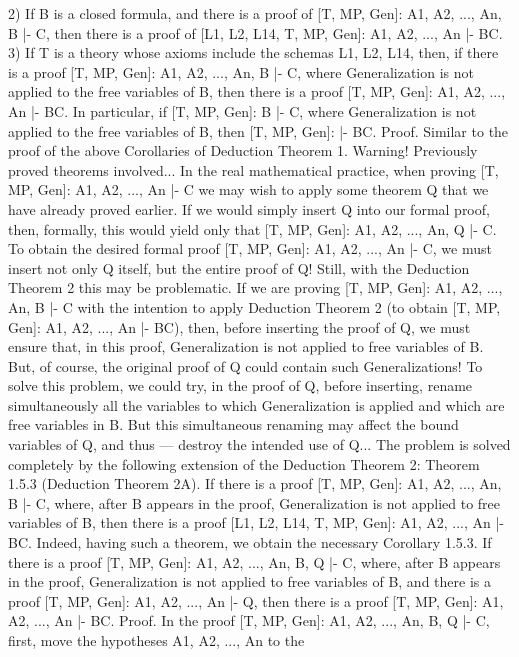 2) If B is a closed formula, and there is a proof of [T, MP, Gen]: A1, A2, ..., An, B |- C, then there is a
proof of [L1, L2, L14, T, MP, Gen]: A1, A2, ..., An |- B\IMPLIES C.
3) If T is a theory whose axioms include the schemas L1, L2, L14, then, if there is a proof [T, MP, Gen]:
A1, A2, ..., An, B |- C, where Generalization is not applied to the free variables of B, then there is a proof
[T, MP, Gen]: A1, A2, ..., An |- B\IMPLIES C. In particular, if [T, MP, Gen]: B |- C, where Generalization is not
applied to the free variables of B, then [T, MP, Gen]: |- B\IMPLIES C.
Proof. Similar to the proof of the above Corollaries of Deduction Theorem 1.
Warning! Previously proved theorems involved...
In the real mathematical practice, when proving [T, MP, Gen]: A1, A2, ..., An |- C we may wish to apply
some theorem Q that we have already proved earlier. If we would simply insert Q into our formal proof,
then, formally, this would yield only that [T, MP, Gen]: A1, A2, ..., An, Q |- C. To obtain the desired formal
proof [T, MP, Gen]: A1, A2, ..., An |- C, we must insert not only Q itself, but the entire proof of Q!
Still, with the Deduction Theorem 2 this may be problematic. If we are proving [T, MP, Gen]: A1, A2, ...,
An, B |- C with the intention to apply Deduction Theorem 2 (to obtain [T, MP, Gen]: A1, A2, ..., An |-
B\IMPLIES C), then, before inserting the proof of Q, we must ensure that, in this proof, Generalization is not
applied to free variables of B. But, of course, the original proof of Q could contain such Generalizations!
To solve this problem, we could try, in the proof of Q, before inserting, rename simultaneously all the
variables to which Generalization is applied and which are free variables in B. But this simultaneous
renaming may affect the bound variables of Q, and thus --- destroy the intended use of Q...
The problem is solved completely by the following extension of the Deduction Theorem 2:
Theorem 1.5.3 (Deduction Theorem 2A). If there is a proof [T, MP, Gen]: A1, A2, ..., An, B |- C, where,
after B appears in the proof, Generalization is not applied to free variables of B, then there is a proof
[L1, L2, L14, T, MP, Gen]: A1, A2, ..., An |- B\IMPLIES C.
Indeed, having such a theorem, we obtain the necessary
Corollary 1.5.3. If there is a proof [T, MP, Gen]: A1, A2, ..., An, B, Q |- C, where, after B appears in the
proof, Generalization is not applied to free variables of B, and there is a proof [T, MP, Gen]: A1, A2, ...,
An |- Q, then there is a proof [T, MP, Gen]: A1, A2, ..., An |- B\IMPLIES C.
Proof. In the proof [T, MP, Gen]: A1, A2, ..., An, B, Q |- C, first, move the hypotheses A1, A2, ..., An to the

